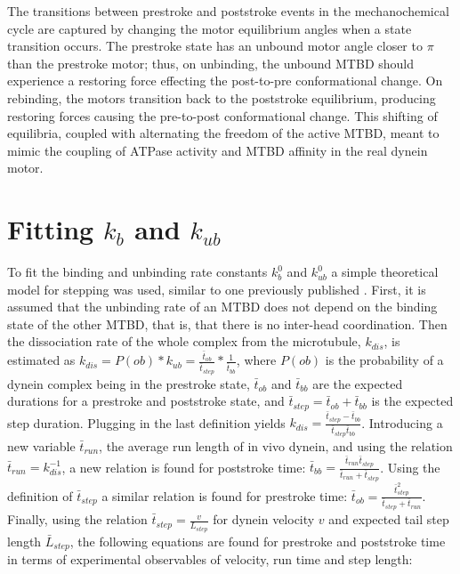 \documentclass[9pt,twocolumn,twoside]{article}
\begin{document}
The transitions between prestroke and poststroke events in the mechanochemical cycle \cite{cianfrocco} are captured by changing the motor equilibrium angles when a state transition occurs. The prestroke state has an unbound motor angle closer to $\pi$ than the prestroke motor\cite{burgess-paper}; thus, on unbinding, the unbound MTBD should experience a restoring force effecting the post-to-pre conformational change. On rebinding, the motors transition back to the poststroke equilibrium, producing restoring forces causing the pre-to-post conformational change. This shifting of equilibria, coupled with alternating the freedom of the active MTBD, meant to mimic the coupling of ATPase activity and MTBD affinity in the real dynein motor.

  \section*{Fitting $k_b$ and $k_{ub}$}
  To fit the binding and unbinding rate constants $k^0_b$ and $k^0_{ub}$ a simple theoretical model for stepping was used, similar to one previously published \cite{myosindutyratio}. First, it is assumed that the unbinding rate of an MTBD does not depend on the binding state of the other MTBD, that is, that there is no inter-head coordination. Then the dissociation rate of the whole complex from the microtubule, $k_{dis}$, is estimated as $k_{dis} = P(ob)*k_{ub} = \frac{\bar{t}_{ob}}{\bar{t}_{step}} * \frac{1}{\bar{t}_{bb}}$, where $P(ob)$ is the probability of a dynein complex being in the prestroke state, $\bar{t}_{ob}$ and $\bar{t}_{bb}$ are the expected durations for a prestroke and poststroke state, and $\bar{t}_{step} = \bar{t}_{ob} + \bar{t}_{bb}$ is the expected step duration. Plugging in the last definition yields $k_{dis} = \frac{\bar{t}_{step} - \bar{t}_{bb}}{\bar{t}_{step}\bar{t}_{bb}}$. Introducing a new variable $\bar{t}_{run}$, the average run length of in vivo dynein, and using the relation $\bar{t}_{run} = k_{dis}^{-1}$, a new relation is found for poststroke time: $\bar{t}_{bb} = \frac{\bar{t}_{run}\bar{t}_{step}}{\bar{t}_{run}+\bar{t}_{step}}$. Using the definition of $\bar{t}_{step}$ a similar relation is found for prestroke time: $\bar{t}_{ob} = \frac{\bar{t}_{step}^2}{\bar{t}_{step}+\bar{t}_{run}}$. Finally, using the relation $\bar{t}_{step} = \frac{v}{L_{step}}$ for dynein velocity $v$ and expected tail step length $\bar{L}_{step}$, the following equations are found for prestroke and poststroke time in terms of experimental observables of velocity, run time and step length:
\end{document}
